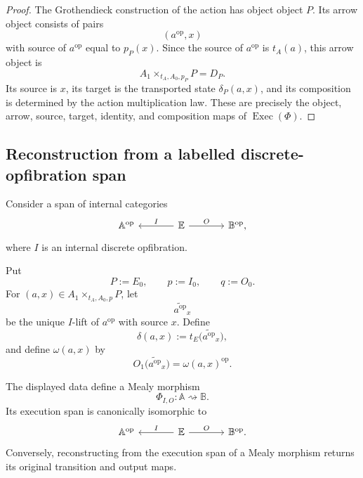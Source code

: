 \begin{proof}
The Grothendieck construction of the action has object object \(P\). Its
arrow object consists of pairs
\[
    (a^{\mathrm{op}},x)
\]
with source of \(a^{\mathrm{op}}\) equal to \(p_P(x)\). Since the source
of \(a^{\mathrm{op}}\) is \(t_A(a)\), this arrow object is
\[
    A_1\times_{t_A,A_0,p_P}P=D_P.
\]
Its source is \(x\), its target is the transported state
\(\delta_P(a,x)\), and its composition is determined by the action
multiplication law. These are precisely the object, arrow, source, target,
identity, and composition maps of \(\operatorname{Exec}(\Phi)\).
\end{proof}

\subsection{Reconstruction from a labelled discrete-opfibration span}
\label{subsec:reconstruction-labelled-dopf-span}

Consider a span of internal categories
\[
\begin{tikzcd}[column sep=large]
    \mathbb A^{\mathrm{op}}
    &
    \mathbb E
        \arrow[l,"I"']
        \arrow[r,"O"]
    &
    \mathbb B^{\mathrm{op}},
\end{tikzcd}
\]
where \(I\) is an internal discrete opfibration.

Put
\[
    P:=E_0,
    \qquad
    p:=I_0,
    \qquad
    q:=O_0.
\]
For \((a,x)\in A_1\times_{t_A,A_0,p}P\), let
\[
    \widetilde{a^{\mathrm{op}}}_x
\]
be the unique \(I\)-lift of \(a^{\mathrm{op}}\) with source \(x\).
Define
\[
    \delta(a,x)
    :=
    t_E\bigl(\widetilde{a^{\mathrm{op}}}_x\bigr),
\]
and define \(\omega(a,x)\) by
\[
    O_1\bigl(\widetilde{a^{\mathrm{op}}}_x\bigr)
    =
    \omega(a,x)^{\mathrm{op}}.
\]

\begin{theorem}
\label{thm:reconstruction-mealy-from-dopf-span}
The displayed data define a Mealy morphism
\[
    \Phi_{I,O}:\mathbb A\rightsquigarrow\mathbb B.
\]
Its execution span is canonically isomorphic to
\[
\begin{tikzcd}[column sep=large]
    \mathbb A^{\mathrm{op}}
    &
    \mathbb E
        \arrow[l,"I"']
        \arrow[r,"O"]
    &
    \mathbb B^{\mathrm{op}}.
\end{tikzcd}
\]
Conversely, reconstructing from the execution span of a Mealy morphism
returns its original transition and output maps.
\end{theorem}

